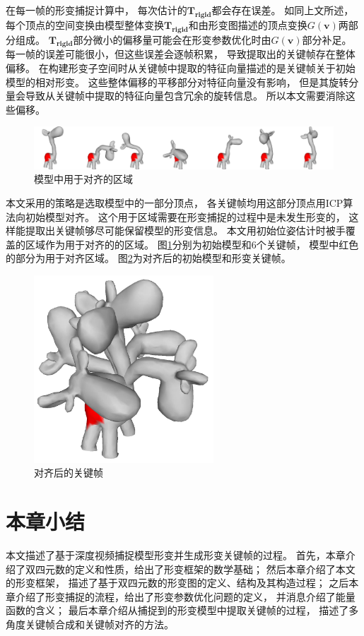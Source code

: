 在每一帧的形变捕捉计算中，
每次估计的$\bm{T_{rigid}}$都会存在误差。
如同上文所述，
每个顶点的空间变换由模型整体变换$\bm{T_{rigid}}$和由形变图描述的顶点变换$G(\bm{v})$两部分组成。
$\bm{T_{rigid}}$部分微小的偏移量可能会在形变参数优化时由$G(\bm{v})$部分补足。
每一帧的误差可能很小，但这些误差会逐帧积累，
导致提取出的关键帧存在整体偏移。
在构建形变子空间时从关键帧中提取的特征向量描述的是关键帧关于初始模型的相对形变。
这些整体偏移的平移部分对特征向量没有影响，
但是其旋转分量会导致从关键帧中提取的特征向量包含冗余的旋转信息。
所以本文需要消除这些偏移。
\begin{figure}
    \centering
    \includegraphics[width = \textwidth]{./Pictures/align_area.png}
    \caption{模型中用于对齐的区域}
    \label{align_area}
\end{figure}
本文采用的策略是选取模型中的一部分顶点，
各关键帧均用这部分顶点用ICP算法向初始模型对齐。
这个用于区域需要在形变捕捉的过程中是未发生形变的，
这样能提取出关键帧够尽可能保留模型的形变信息。
本文用初始位姿估计时被手覆盖的区域作为用于对齐的的区域。
图\ref{align_area}分别为初始模型和6个关键帧，
模型中红色的部分为用于对齐区域。
图\ref{after_align}为对齐后的初始模型和形变关键帧。
\begin{figure}[h]
    \centering
    \includegraphics[width = 0.6\textwidth]{./Pictures/after_align.jpg}
    \caption{对齐后的关键帧}
    \label{after_align}
\end{figure}
\section{本章小结}
本文描述了基于深度视频捕捉模型形变并生成形变关键帧的过程。
首先，本章介绍了双四元数的定义和性质，给出了形变框架的数学基础；
然后本章介绍了本文的形变框架，
描述了基于双四元数的形变图的定义、结构及其构造过程；
之后本章介绍了形变捕捉的流程，给出了形变参数优化问题的定义，
并消息介绍了能量函数的含义；
最后本章介绍从捕捉到的形变模型中提取关键帧的过程，
描述了多角度关键帧合成和关键帧对齐的方法。
